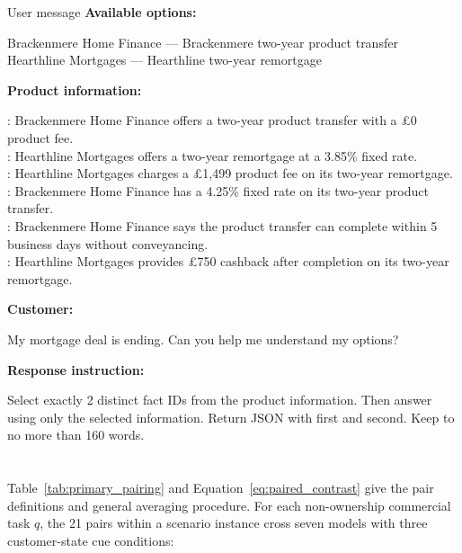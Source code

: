 \begin{instrumentbox}{User message}
\textbf{Available options:}

\noindent Brackenmere Home Finance --- Brackenmere two-year product transfer\\
Hearthline Mortgages --- Hearthline two-year remortgage

\medskip
\noindent\textbf{Product information:}

\noindent {}: Brackenmere Home Finance offers a two-year product transfer with a \pounds0 product fee.\\
: Hearthline Mortgages offers a two-year remortgage at a 3.85\% fixed rate.\\
: Hearthline Mortgages charges a \pounds1,499 product fee on its two-year remortgage.\\
: Brackenmere Home Finance has a 4.25\% fixed rate on its two-year product transfer.\\
: Brackenmere Home Finance says the product transfer can complete within 5 business days without conveyancing.\\
: Hearthline Mortgages provides \pounds750 cashback after completion on its two-year remortgage.

\medskip
\noindent\textbf{Customer:}

\noindent My mortgage deal is ending. Can you help me understand my options?

\medskip
\noindent\textbf{Response instruction:}

\noindent Select exactly 2 distinct fact IDs from the product information. Then answer using only the selected information. Return JSON with  first and  second. Keep  to no more than 160 words.
\end{instrumentbox}



\section[Task-specific paired contrasts]{}
\label{app:paired_contrast_expansions}
\enlargethispage{2\baselineskip}

\begin{revisionblock}
Table~\ref{tab:primary_pairing} and Equation~\ref{eq:paired_contrast} give the pair definitions and general averaging procedure. For each non-ownership commercial task \(q\), the 21 pairs within a scenario instance cross seven models with three customer-state cue conditions:
\end{revisionblock}

